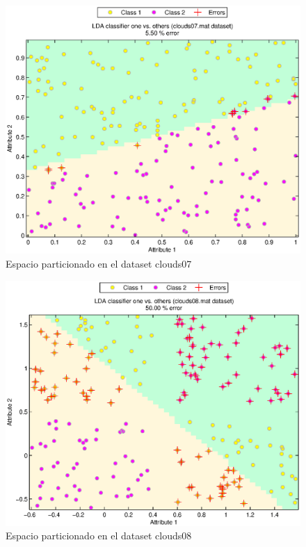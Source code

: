 \documentclass[journal]{IEEEtran}
\begin{document}
\begin{figure}[tb]
	\begin{center}
		\includegraphics[width=\columnwidth]{imagenes/clouds07}
	\end{center}
	\caption{Espacio particionado en el dataset clouds07}
	\label{fig:lda-dataset-07}
\end{figure}

\begin{figure}[tb]
	\begin{center}
		\includegraphics[width=\columnwidth]{imagenes/clouds08}
	\end{center}
	\caption{Espacio particionado en el dataset clouds08}
	\label{fig:lda-dataset-08}
\end{figure}
\end{document}
